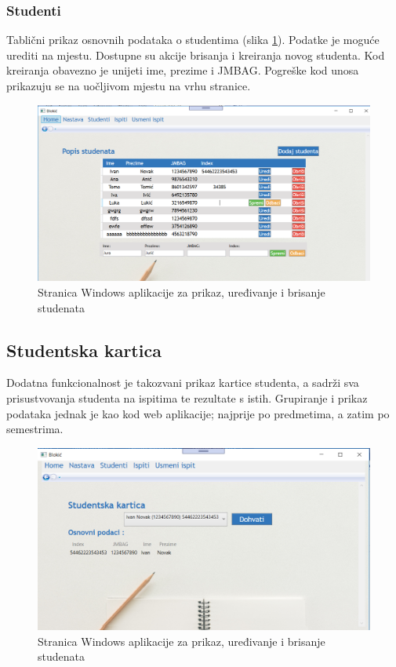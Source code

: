 \documentclass[times, utf8, diplomski]{fer}
\begin{document}
\subsubsection{Studenti}
Tablični prikaz osnovnih podataka o studentima (slika \ref{fig:studentss}). Podatke je moguće urediti na mjestu. Dostupne su akcije brisanja i kreiranja novog studenta. Kod kreiranja obavezno je unijeti ime, prezime i JMBAG. Pogreške kod unosa prikazuju se na uočljivom mjestu na vrhu stranice.

\begin{figure}[htb]
\centering
\includegraphics[width=12cm]{students.PNG}
\caption{Stranica Windows aplikacije za prikaz, uređivanje i brisanje studenata}
\label{fig:studentss}
\end{figure}

\subsection{Studentska kartica}
Dodatna funkcionalnost je takozvani prikaz kartice studenta, a sadrži sva prisustvovanja studenta na ispitima te rezultate s istih. Grupiranje i prikaz podataka jednak je kao kod web aplikacije; najprije po predmetima, a zatim po semestrima.
\begin{figure}[htb]
\centering
\includegraphics[width=12cm]{studentcard.PNG}
\caption{Stranica Windows aplikacije za prikaz, uređivanje i brisanje studenata}
\label{fig:studentCard}
\end{figure}
\end{document}
